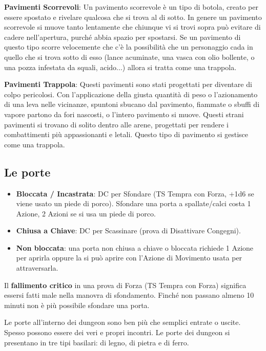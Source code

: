 \begin{multicols}{2}
\textbf{Pavimenti Scorrevoli}: Un pavimento scorrevole è un tipo di botola, creato per essere spostato e rivelare qualcosa che si trova al di sotto. In genere un pavimento scorrevole si muove tanto lentamente che chiunque vi si trovi sopra può evitare di cadere nell'apertura, purché abbia spazio per spostarsi. Se un pavimento di questo tipo scorre velocemente che c'è la possibilità che un personaggio cada in quello che si trova sotto di esso (lance acuminate, una vasca con olio bollente, o una pozza infestata da squali, acido...) allora si tratta come una trappola.

\textbf{Pavimenti Trappola}: Questi pavimenti sono stati progettati per diventare di colpo pericolosi. Con l'applicazione della giusta quantità di peso o l'azionamento di una leva nelle vicinanze, spuntoni sbucano dal pavimento, fiammate o sbuffi di vapore partono da fori nascosti, o l'intero pavimento si muove. Questi strani pavimenti si trovano di solito dentro alle arene, progettati per rendere i combattimenti più appassionanti e letali. Questo tipo di pavimento si gestisce come una trappola.

\subsection{Le porte}

\noindent\begin{itemize}[leftmargin=*] \setlength{\itemsep}{0pt}
\item \textbf{Bloccata / Incastrata}: DC per Sfondare (TS Tempra con Forza, +1d6 se viene usato un piede di porco). Sfondare una porta a spallate/calci costa 1 Azione, 2 Azioni se si usa un piede di porco.
\item \textbf{Chiusa a Chiave}: DC per Scassinare (prova di Disattivare Congegni).
\item \textbf{Non bloccata}: una porta non chiusa a chiave o bloccata richiede 1 Azione per aprirla oppure la si può aprire con l'Azione di Movimento usata per attraversarla.
\end{itemize}

\medskip

Il \textbf{fallimento critico} in una prova di Forza (TS Tempra con Forza) significa essersi fatti male nella manovra di sfondamento. Finché non passano almeno 10 minuti non è più possibile sfondare una porta.

Le porte all'interno dei dungeon sono ben più che semplici entrate o uscite. Spesso possono essere dei veri e propri incontri. Le porte dei dungeon si presentano in tre tipi basilari: di legno, di pietra e di ferro.

\end{multicols}

